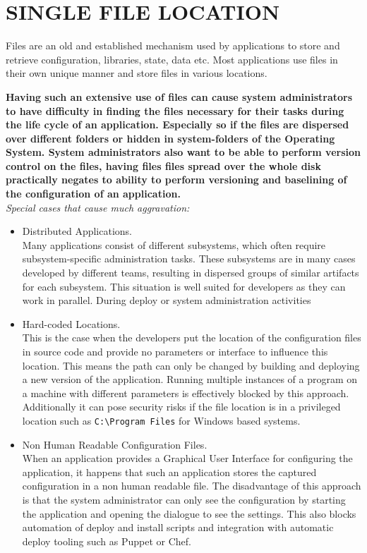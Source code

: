 \newpage
\section*{SINGLE FILE LOCATION}
Files are an old and established mechanism used by applications to store and retrieve configuration, libraries, state, data etc. Most applications use files in their own unique manner and store files in various locations.
\begin{center}
  
\end{center}

\textbf{Having such an extensive use of files can cause system administrators to have difficulty in finding the files necessary for their tasks during the life cycle of an application. Especially so if the files are dispersed over different folders or hidden in system-folders of the Operating System. System administrators also want to be able to perform version control on the files, having files files spread  over the whole disk practically negates to ability to perform versioning and baselining of the configuration of an application.}\\

\textit{Special cases that cause much aggravation:}
\begin{itemize}
\item Distributed Applications.\\
Many applications consist of different subsystems, which often require  subsystem-specific administration tasks. These subsystems are in many cases developed by different teams, resulting in dispersed groups of similar artifacts for each subsystem. This situation is well suited for developers as they can work in parallel. During deploy or system administration activities 
\item Hard-coded Locations.\\
This is the case when the developers put the location of the configuration files in source code and provide no parameters or interface to influence this location. This means the path can only be changed by building and deploying a new version of the application. Running multiple instances of a program on a machine with different parameters is effectively blocked by this approach. Additionally it can pose security risks if the file location is in a privileged location such as \verb|C:\Program Files| for Windows based systems.
\item Non Human Readable Configuration Files.\\
When an application provides a Graphical User Interface for configuring the application, it happens that such an application stores the captured configuration in a non human readable file. The disadvantage of this approach is that the system administrator can only see the configuration by starting the application and opening the dialogue to see the settings. This also blocks automation of deploy and install scripts and integration with automatic deploy tooling such as Puppet or Chef.
\end{itemize}

